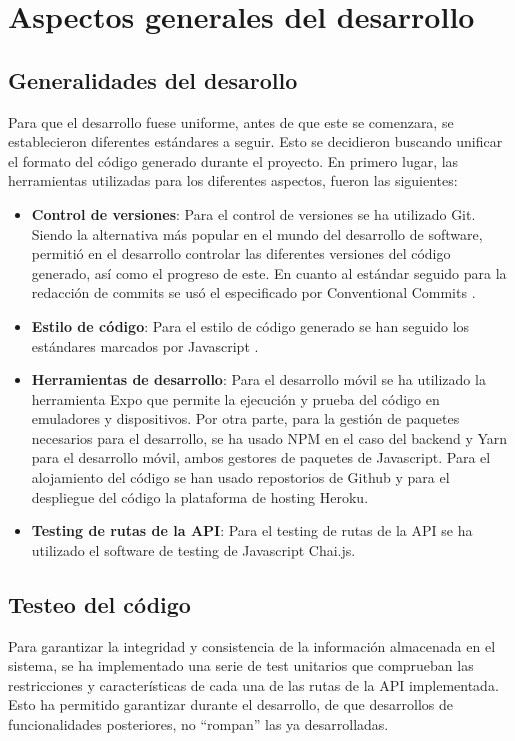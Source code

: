\section{Aspectos generales del desarrollo}

\subsection{Generalidades del desarollo}

Para que el desarrollo fuese uniforme, antes de que este se comenzara, se establecieron diferentes estándares a seguir. Esto se decidieron buscando unificar el formato del código generado durante el proyecto. En primero lugar, las herramientas utilizadas para los diferentes aspectos, fueron las siguientes:

\begin{itemize}
    \item \textbf{Control de versiones}: Para el control de versiones se ha utilizado Git. Siendo la alternativa más popular en el mundo del desarrollo de software, permitió en el desarrollo controlar las diferentes versiones del código generado, así como el progreso de este. En cuanto al estándar seguido para la redacción de commits se usó el especificado por Conventional Commits \cite{standardgit}.
    \item \textbf{Estilo de código}: Para el estilo de código generado se han seguido los estándares marcados por Javascript \cite{standardjs}.
    \item \textbf{Herramientas de desarrollo}: Para el desarrollo móvil se ha utilizado la herramienta Expo que permite la ejecución y prueba del código en emuladores y dispositivos. Por otra parte, para la gestión de paquetes necesarios para el desarrollo, se ha usado NPM en el caso del backend y Yarn para el desarrollo móvil, ambos gestores de paquetes de Javascript. Para el alojamiento del código se han usado repostorios de Github y para el despliegue del código la plataforma de hosting Heroku.
    \item \textbf{Testing de rutas de la API}: Para el testing de rutas de la API se ha utilizado el software de testing de Javascript Chai.js.
\end{itemize}

\subsection{Testeo del código}

Para garantizar la integridad y consistencia de la información almacenada en el sistema, se ha implementado una serie de test unitarios que comprueban las restricciones y características de cada una de las rutas de la API implementada. Esto ha permitido garantizar durante el desarrollo, de que desarrollos de funcionalidades posteriores, no ``rompan'' las ya desarrolladas.


